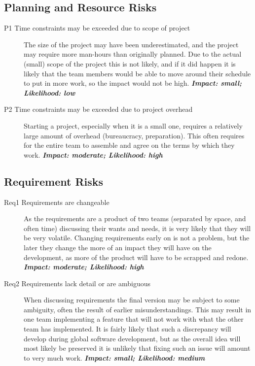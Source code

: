 \subsection{Planning and Resource Risks}
\begin{description}
    \item[P1 Time constraints may be exceeded due to scope of project] The size of the project may have
        been underestimated, and the project may require more man-hours than originally planned. Due to the
        actual (small) scope of the project this is not likely, and if it did happen it is likely that the
        team members would be able to move around their schedule to put in more work, so the impact would
        not be high.\newline
        \textbf{\emph{Impact: small; Likelihood: low}}
    \item[P2 Time constraints may be exceeded due to project overhead] Starting a project, especially when
        it is a small one, requires a relatively large amount of overhead (bureaucracy, preparation). This
        often requires for the entire team to assemble and agree on the terms by which they work.\newline
        \textbf{\emph{Impact: moderate; Likelihood: high}}
\end{description}

\subsection{Requirement Risks}
\begin{description}
    \item[Req1 Requirements are changeable] As the requirements are a product of two teams (separated by
        space, and often time) discussing their wants and needs, it is very likely that they will be very
        volatile. Changing requirements early on is not a problem, but the later they change the more of an
        impact they will have on the development, as more of the product will have to be scrapped and redone.
        \newline
        \textbf{\emph{Impact: moderate; Likelihood: high}}
    \item[Req2 Requirements lack detail or are ambiguous] When discussing requirements the final version may
        be subject to some ambiguity, often the result of earlier misunderstandings. This may result in one
        team implementing a feature that will not work with what the other team has implemented. It is fairly
        likely that such a discrepancy will develop during global software development, but as the overall
        idea will most likely be preserved it is unlikely that fixing such an issue will amount to very much work.
        \newline
        \textbf{\emph{Impact: small; Likelihood: medium}}
\end{description}
